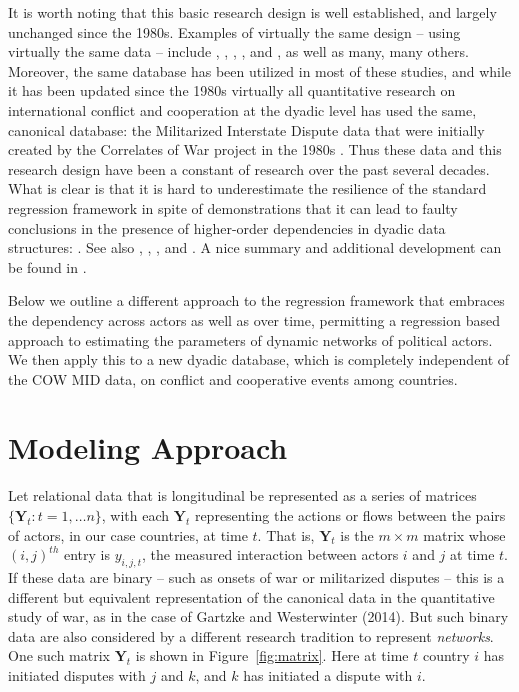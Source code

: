 \documentclass[3p,times,twocolumn,authoryear,12pt]{elsarticle}
\newcommand{\bl}[1]{{\mathbf #1}}
\begin{document}
It is worth noting that this basic research design is well established, and largely unchanged since the 1980s. Examples of virtually the same design -- using virtually the same data -- include \cite{maoz:abdolali:1989}, \cite{bremer:1992}, \cite{maoz:russett:1993},  \cite{bremer:cusack:1995}, and \cite{pevehouse:russett:2006}, as well as many, many others. Moreover, the same database has been utilized in most of these studies, and while it has been updated since the 1980s virtually all quantitative research on international conflict and cooperation at the dyadic level has used the same, canonical database: the Militarized Interstate Dispute data that were initially created by the Correlates of War project in the 1980s \citep{palmer:etal:2015}. Thus these data and this research design have been a constant of research over the past several decades. What is clear is that it is hard to underestimate the resilience of the standard regression framework in spite of demonstrations that it can lead to faulty conclusions in the presence of higher-order dependencies in dyadic data structures: \cite{hoff:raftery:etal:2002,hoff:ward:2004,hoff:2005,hoff:2010}. See also \cite{cranmer:desmarais:2011}, \cite{desmarais:cranmer:2012}, \cite{cranmer:desmarais:etal:2012}, and \cite{snijders:koskinen:etal:2012}. A nice summary and additional development can be found in \cite{stewart:2014}. 

Below we outline a different approach to the regression framework that embraces the dependency across actors as well as over time, permitting a regression based approach to estimating the parameters of dynamic networks of political actors. We then apply this to a new dyadic database, which is completely independent of the COW MID data, on conflict and cooperative events among countries.

\section{Modeling Approach}

Let relational data that is longitudinal be represented as a series of matrices $\{\bl Y_t : t = 1, \ldots n\}$, with each $\bl Y_t$ representing the actions or flows between the pairs of actors, in our case countries, at time $t$. That is, $\bl Y_t$ is the $m\times m$ matrix whose $(i,j)^{th}$ entry is $y_{i,j,t}$, the measured interaction between actors $i$ and $j$ at time $t$. If these data are binary -- such as onsets of war or militarized disputes -- this is a different but equivalent representation of the canonical data in the quantitative study of war, as in the case of Gartzke and Westerwinter (2014). But such binary data are also considered by a different research tradition to represent {\em networks}. One such matrix  $\bl Y_t$ is shown in Figure~\ref{fig:matrix}. Here at time $t$ country $i$ has initiated disputes with $j$ and $k$, and $k$ has initiated a dispute with $i$. 
\end{document}
